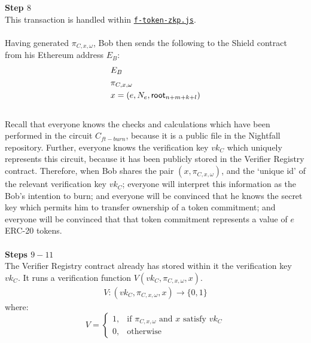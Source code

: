 \textbf{Step $8$}
\ \\
This transaction is handled within \hyperref[sec:f-token-zkp]{\texttt{f-token-zkp.js}}.\\
\\
Having generated $\pi_{C,x,\omega}$, Bob then sends the following to the Shield contract from his Ethereum address $E_B$:
\begin{align*}
  &E_B\\
  &\pi_{C,x,\omega}\\
  &x = (e, N_{e}, \mathsf{root}_{n+m+k+l})
\end{align*}
\\
Recall that everyone knows the checks and calculations which have been performed in the circuit $C_{ft-burn}$, because it is a public file in the Nightfall repository. Further, everyone knows the verification key $vk_C$ which uniquely represents this circuit, because it has been publicly stored in the Verifier Registry contract. Therefore, when Bob shares the pair $(x, \pi_{C,x,\omega})$, and the `unique id' of the relevant verification key $vk_C$; everyone will interpret this information as the Bob's intention to burn; and everyone will be convinced that he knows the secret key which permits him to transfer ownership of a token commitment; and everyone will be convinced that that token commitment represents a value of $e$ ERC-20 tokens.\\
\\


\textbf{Steps $9 - 11$}
\ \\
The Verifier Registry contract already has stored within it the verification key $vk_C$.
It runs a verification function $V(vk_C, \pi_{C,x,\omega}, x)$.
\begin{align*}
  V: (vk_C, \pi_{C,x,\omega}, x) \to \{0,1\}
\end{align*}
where:
\[
    V=
\begin{cases}
    1,& \text{if } \pi_{C,x,\omega} \text{ and } x \text{ satisfy } vk_C\\
    0,& \text{otherwise}
\end{cases}
\]
\ \\




